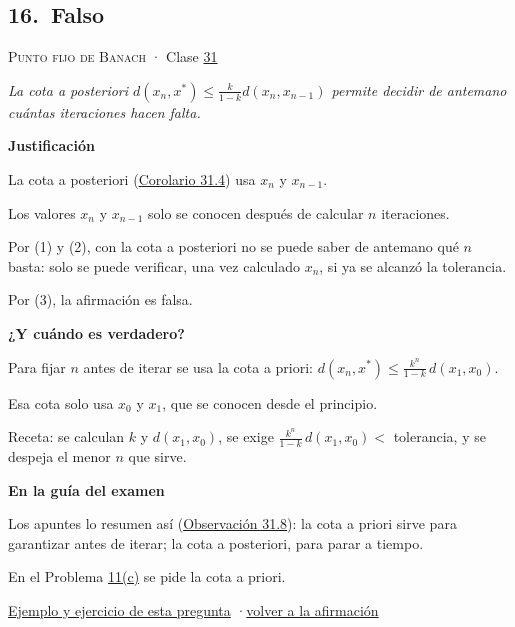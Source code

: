 \documentclass[11pt,a4paper]{article}
\providecommand{\lt}{<}\providecommand{\gt}{>}
\newcommand{\bloque}[1]{\par\smallskip\noindent\textbf{\color{acento}#1}\par}
\begin{document}
\subsection*{\hypertarget{r-16}{}16.\ \textcolor{bad}{Falso}}
{\small \textsc{Punto fijo de Banach} · Clase \href{https://decostruttivismo.github.io/MAT2514-repaso/pdf/MAT2514_apuntes_completos.pdf\#nameddest=section.31}{31}}\par
\emph{La cota a posteriori $d(x_n,x^*)\le\frac k{1-k}d(x_n,x_{n-1})$ permite decidir de antemano cuántas iteraciones hacen falta.}
\bloque{Justificación}
\begin{pasos}
\item[(1)] La cota a posteriori (\href{https://decostruttivismo.github.io/MAT2514-repaso/pdf/MAT2514_apuntes_completos.pdf\#nameddest=teorema.31.4}{Corolario 31.4}) usa $x_n$ y $x_{n-1}$.
\item[(2)] Los valores $x_n$ y $x_{n-1}$ solo se conocen después de calcular $n$ iteraciones.
\item[(3)] Por (1) y (2), con la cota a posteriori no se puede saber de antemano qué $n$ basta: solo se puede verificar, una vez calculado $x_n$, si ya se alcanzó la tolerancia.
\item[] Por (3), la afirmación es falsa.
\end{pasos}
\bloque{¿Y cuándo es verdadero?}
\begin{pasos}
\item[] Para fijar $n$ antes de iterar se usa la cota a priori: $d(x_n,x^*)\le\frac{k^n}{1-k}\,d(x_1,x_0)$.
\item[] Esa cota solo usa $x_0$ y $x_1$, que se conocen desde el principio.
\item[] Receta: se calculan $k$ y $d(x_1,x_0)$, se exige $\frac{k^n}{1-k}\,d(x_1,x_0)\lt $ tolerancia, y se despeja el menor $n$ que sirve.
\end{pasos}
\bloque{En la guía del examen}
\begin{pasos}
\item[] Los apuntes lo resumen así (\href{https://decostruttivismo.github.io/MAT2514-repaso/pdf/MAT2514_apuntes_completos.pdf\#nameddest=teorema.31.8}{Observación 31.8}): la cota a priori sirve para garantizar antes de iterar; la cota a posteriori, para parar a tiempo.
\item[] En el Problema \hyperlink{prob-11}{11(c)} se pide la cota a priori.
\end{pasos}
\par{}
\par{\small \hyperlink{e-16}{Ejemplo y ejercicio de esta pregunta} \quad·\quad \hyperlink{q-16}{volver a la afirmación}}
\end{document}
